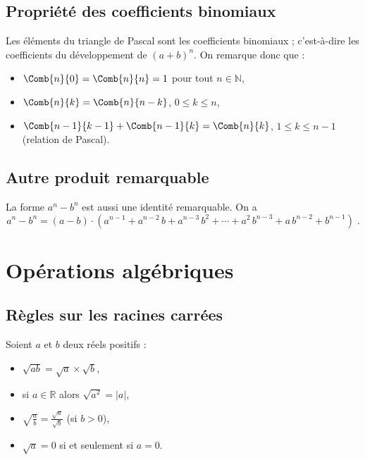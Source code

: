 \subsection{Propri\'et\'e des coefficients binomiaux}
	Les \'el\'ements du triangle de Pascal sont les coefficients binomiaux ; 
	c'est-\`a-dire les coefficients du d\'eveloppement de $(a+b)^n$.
	On remarque donc que : 
	\begin{itemize}
		\item $\Comb{n}{0} = \Comb{n}{n} = 1$ pour tout $n\in\mathbb{N}$,
		\item $\Comb{n}{k} = \Comb{n}{n-k}$, $0 \leq k \leq n$,
		\item $\Comb{n-1}{k-1} + \Comb{n-1}{k} = \Comb{n}{k}$, $1 \leq k \leq n-1$ (relation de Pascal).
	\end{itemize}
\subsection{Autre produit remarquable} 
La forme $a^n - b^n$ est aussi une identit\'e remarquable. On a 
      \[
            a^n - b^n = (a-b) \cdot (a^{n-1} + a^{n-2}\, b + a^{n-3}\, b^2 + \cdots + a^2\, b^{n-3} + a\, b^{n-2} + b^{n-1} )
            \;.
      \]

\section{Op\'erations alg\'ebriques}
	\subsection{R\`egles sur les racines carr\'ees}
			Soient $a$ et $b$ deux r\'eels positifs : \newline
			\begin{minipage}[b]{.45\actualtextwidth}
				\begin{itemize}
					\item $\sqrt{a b} = \sqrt{a} \times \sqrt{b}$,
					\item si $a\in\mathbb{R}$ alors $\sqrt{a^2} = |a| $,
				\end{itemize}
			\end{minipage}
			\begin{minipage}[b]{.45\actualtextwidth}
				\begin{itemize}
					\item $\displaystyle \sqrt{\frac{a}{b}} = \frac{\sqrt{a}}{\sqrt{b}}$ (si $b > 0$),
					\item $\sqrt{a} = 0 $ si et seulement si $a = 0$.
				\end{itemize}
			\end{minipage}
	
